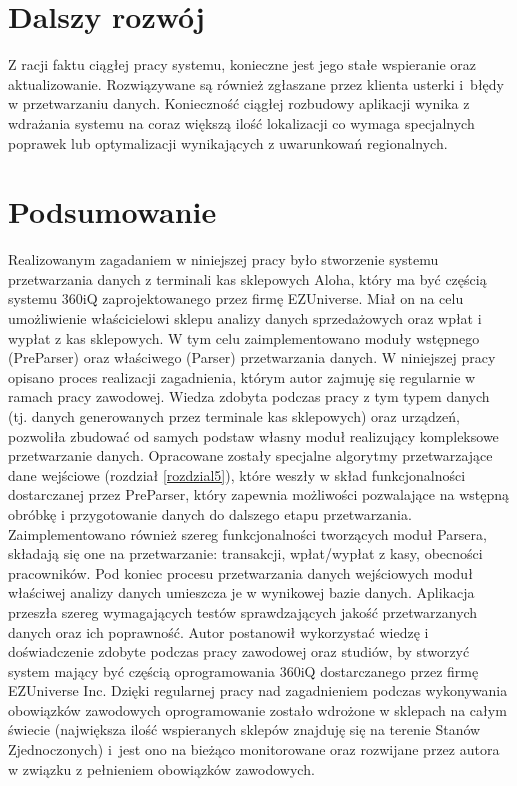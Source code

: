 \documentclass[a4paper]{book}
\begin{document}
\section{Dalszy rozwój}
Z racji faktu ciągłej pracy systemu, konieczne jest jego stałe wspieranie oraz aktualizowanie. Rozwiązywane są również zgłaszane przez klienta usterki i~błędy w przetwarzaniu danych. Konieczność ciągłej rozbudowy aplikacji wynika z wdrażania systemu na coraz większą ilość lokalizacji co wymaga specjalnych poprawek lub optymalizacji wynikających z uwarunkowań regionalnych.
\section{Podsumowanie}
Realizowanym zagadaniem w niniejszej pracy było stworzenie systemu przetwarzania danych z terminali kas sklepowych Aloha, który ma być częścią systemu 360iQ zaprojektowanego przez firmę EZUniverse. Miał on na celu umożliwienie właścicielowi sklepu analizy danych sprzedażowych oraz wpłat i wypłat z kas sklepowych. W tym celu zaimplementowano moduły wstępnego (PreParser) oraz właściwego (Parser) przetwarzania danych.
W niniejszej pracy opisano proces realizacji zagadnienia, którym autor zajmuję się regularnie w ramach pracy zawodowej. Wiedza zdobyta podczas pracy z tym typem danych (tj. danych generowanych przez terminale kas sklepowych) oraz urządzeń, pozwoliła zbudować od samych podstaw własny moduł realizujący kompleksowe przetwarzanie danych. Opracowane zostały specjalne algorytmy przetwarzające dane wejściowe (rozdział \ref{rozdzial5}), które weszły w skład funkcjonalności dostarczanej przez PreParser, który zapewnia możliwości pozwalające na wstępną obróbkę i przygotowanie danych do dalszego etapu przetwarzania. Zaimplementowano również szereg funkcjonalności tworzących moduł Parsera, składają się one na przetwarzanie: transakcji, wpłat/wypłat z kasy, obecności pracowników. Pod koniec procesu przetwarzania danych wejściowych moduł właściwej analizy danych umieszcza je w wynikowej bazie danych. Aplikacja przeszła szereg wymagających testów sprawdzających jakość przetwarzanych danych oraz ich poprawność. Autor postanowił wykorzystać wiedzę i doświadczenie zdobyte podczas pracy zawodowej oraz studiów, by stworzyć system mający być częścią oprogramowania 360iQ dostarczanego przez firmę EZUniverse Inc. Dzięki regularnej pracy nad zagadnieniem podczas wykonywania obowiązków zawodowych oprogramowanie zostało wdrożone w sklepach na całym świecie (największa ilość wspieranych sklepów znajduję się na terenie Stanów Zjednoczonych) i~jest ono na bieżąco monitorowane oraz rozwijane przez autora w związku z pełnieniem obowiązków zawodowych.


\end{document}
